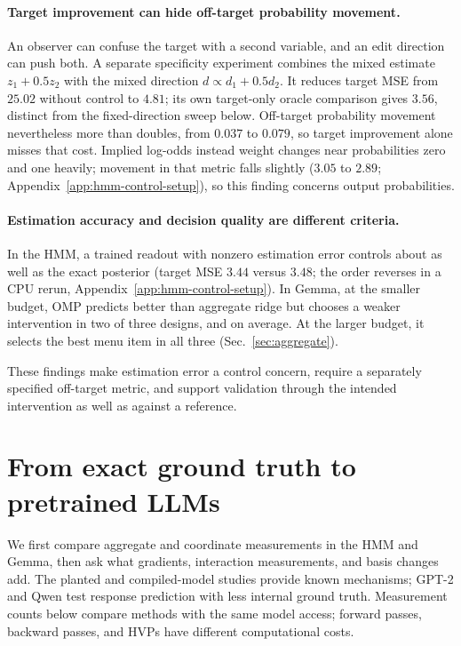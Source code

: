\documentclass[sigconf,10pt,nonacm,balance=false]{acmart}
\begin{document}
\paragraph{Target improvement can hide off-target probability movement.}
An observer can confuse the target with a second variable, and an edit direction can push both. A separate specificity experiment combines the mixed estimate $z_1+0.5z_2$ with the mixed direction $d\propto d_1+0.5d_2$. It reduces target MSE from $25.02$ without control to $4.81$; its own target-only oracle comparison gives $3.56$, distinct from the fixed-direction sweep below. Off-target probability movement nevertheless more than doubles, from $0.037$ to $0.079$, so target improvement alone misses that cost. Implied log-odds instead weight changes near probabilities zero and one heavily; movement in that metric falls slightly ($3.05$ to $2.89$; Appendix~\ref{app:hmm-control-setup}), so this finding concerns output probabilities.

\paragraph{Estimation accuracy and decision quality are different criteria.}
In the HMM, a trained readout with nonzero estimation error controls about as well as the exact posterior (target MSE $3.44$ versus $3.48$; the order reverses in a CPU rerun, Appendix~\ref{app:hmm-control-setup}). In Gemma, at the smaller budget, OMP predicts better than aggregate ridge but chooses a weaker intervention in two of three designs, and on average. At the larger budget, it selects the best menu item in all three (Sec.~\ref{sec:aggregate}).

These findings make estimation error a control concern, require a separately specified off-target metric, and support validation through the intended intervention as well as against a reference.

\section{From exact ground truth to pretrained LLMs}\label{sec:extensions}

We first compare aggregate and coordinate measurements in the HMM and Gemma, then ask what gradients, interaction measurements, and basis changes add. The planted and compiled-model studies provide known mechanisms; GPT-2 and Qwen test response prediction with less internal ground truth. Measurement counts below compare methods with the same model access; forward passes, backward passes, and HVPs have different computational costs.
\end{document}
